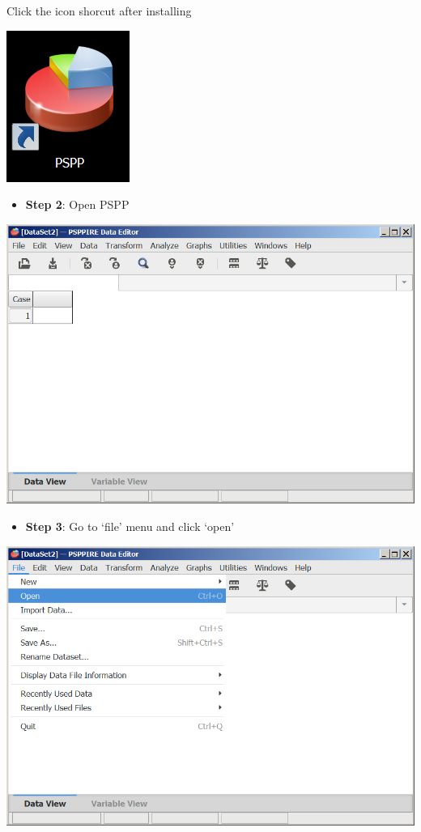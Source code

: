 \documentclass[
]{book}
\providecommand{\tightlist}{%
  \setlength{\itemsep}{0pt}\setlength{\parskip}{0pt}}
\begin{document}
Click the icon shorcut after installing

\includegraphics[width=0.65\linewidth]{images/psppicon}

\begin{itemize}
\tightlist
\item
  \textbf{Step 2}: Open PSPP
\end{itemize}

\includegraphics[width=0.65\linewidth]{images/abacus31}

\begin{itemize}
\tightlist
\item
  \textbf{Step 3}: Go to `file' menu and click `open'
\end{itemize}

\includegraphics[width=0.65\linewidth]{images/abacus32}
\end{document}

